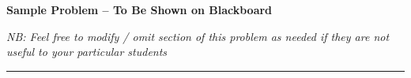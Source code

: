 \documentclass[8pt]{article}
\begin{document}




\begin{minipage}[t]{\textwidth}
\centerline{\textbf{\huge Sample Problem -- To Be Shown on Blackboard}}
\vspace{0.1cm}
\end{minipage}

\begin{minipage}[t]{\textwidth}
\centerline{\textit{NB: Feel free to modify / omit section of this problem as needed if they are not useful to your particular students}}
\vspace{0.2cm}

\noindent\rule[0.5ex]{\linewidth}{1pt}
\end{minipage}


\clearpage
\end{document}
